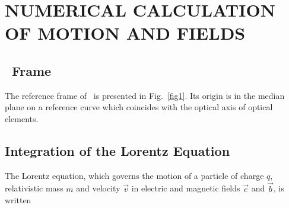 \newpage
\clearemptydoublepage

\section{NUMERICAL CALCULATION OF MOTION AND FIELDS}\label{sec2} %


\subsection{\zgoubi\ Frame} \label{sec2.1}   %

The reference frame of \zgou\  is presented in Fig.~\ref{fig1}.  
Its origin is in the median plane on a reference curve which coincides with the optical 
axis of optical elements. 

\subsection{Integration of the Lorentz Equation} \label{sec2.2}%

The Lorentz equation, which governs the motion of a particle of charge $q$,  relativistic 
mass $m$ and velocity $\vec  v$ in electric and magnetic fields $\vec  e$ and $\vec  b$, is written 


